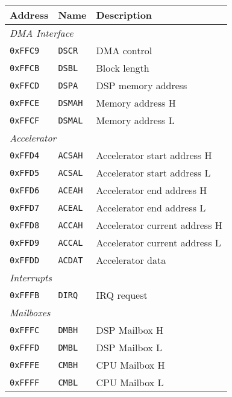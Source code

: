 \documentclass[oneside,english,a4paper,10pt,oneside,openany,final]{memoir}
\newcommand{\Address}[1]{\texttt{#1}}
\newcommand{\Register}[1]{\texttt{#1}}
\begin{document}
\begin{table}[htb]
\centering
\begin{tabular}{|l|l|l|}
\hline
\textbf{Address} & \textbf{Name}    & \textbf{Description}          \\ \hline
\multicolumn{3}{|l|}{\textit{DMA Interface}}                        \\ \hline
\Address{0xFFC9} & \Register{DSCR}  & DMA control                   \\ \hline
\Address{0xFFCB} & \Register{DSBL}  & Block length                  \\ \hline
\Address{0xFFCD} & \Register{DSPA}  & DSP memory address            \\ \hline
\Address{0xFFCE} & \Register{DSMAH} & Memory address H              \\ \hline
\Address{0xFFCF} & \Register{DSMAL} & Memory address L              \\ \hline
\multicolumn{3}{|l|}{\textit{Accelerator}}                          \\ \hline
\Address{0xFFD4} & \Register{ACSAH} & Accelerator start address H   \\ \hline
\Address{0xFFD5} & \Register{ACSAL} & Accelerator start address L   \\ \hline
\Address{0xFFD6} & \Register{ACEAH} & Accelerator end address H     \\ \hline
\Address{0xFFD7} & \Register{ACEAL} & Accelerator end address L     \\ \hline
\Address{0xFFD8} & \Register{ACCAH} & Accelerator current address H \\ \hline
\Address{0xFFD9} & \Register{ACCAL} & Accelerator current address L \\ \hline
\Address{0xFFDD} & \Register{ACDAT} & Accelerator data              \\ \hline
\multicolumn{3}{|l|}{\textit{Interrupts}}                           \\ \hline
\Address{0xFFFB} & \Register{DIRQ}  & IRQ request                   \\ \hline
\multicolumn{3}{|l|}{\textit{Mailboxes}}                            \\ \hline
\Address{0xFFFC} & \Register{DMBH}  & DSP Mailbox H                 \\ \hline
\Address{0xFFFD} & \Register{DMBL}  & DSP Mailbox L                 \\ \hline
\Address{0xFFFE} & \Register{CMBH}  & CPU Mailbox H                 \\ \hline
\Address{0xFFFF} & \Register{CMBL}  & CPU Mailbox L                 \\ \hline
\end{tabular}
\end{table}
\end{document}

